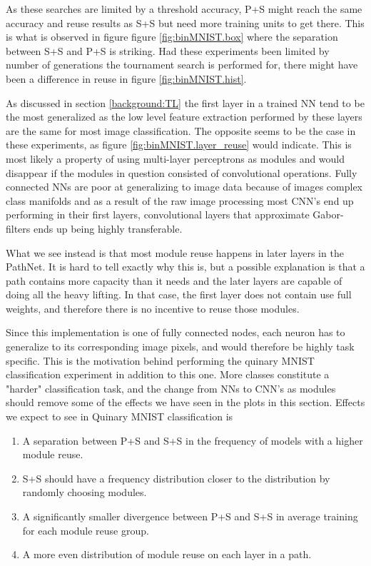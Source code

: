 As these searches are limited by a threshold accuracy, P+S might reach the same accuracy and reuse results as S+S but need more training units to get there. This is what is observed in figure figure \ref{fig:binMNIST.box} where the separation between S+S and P+S is striking. Had these experiments been limited by number of generations the tournament search is performed for, there might have been a difference in reuse in figure \ref{fig:binMNIST.hist}.

As discussed in section \ref{background:TL} the first layer in a trained NN tend to be the most generalized as the low level feature extraction performed by these layers are the same for most image classification. The opposite seems to be the case in these experiments, as figure \ref{fig:binMNIST.layer_reuse} would indicate. This is most likely a property of using multi-layer perceptrons as modules and would disappear if the modules in question consisted of convolutional operations. Fully connected NNs are poor at generalizing to image data because of images complex class manifolds and as a result of the raw image processing most CNN's end up performing in their first layers, convolutional layers that approximate Gabor-filters ends up being highly transferable\cite{yosinski2014transferable}.

What we see instead is that most module reuse happens in later layers in the PathNet. It is hard to tell exactly why this is, but a possible explanation is that a path contains more capacity than it needs and the later layers are capable of doing all the heavy lifting. In that case, the first layer does not contain use full weights, and therefore there is no incentive to reuse those modules. 

Since this implementation is one of fully connected nodes, each neuron has to generalize to its corresponding image pixels, and would therefore be highly task specific. This is the motivation behind performing the quinary MNIST classification experiment in addition to this one. More classes constitute a "harder" classification task, and the change from NNs to CNN's as modules should remove some of the effects we have seen in the plots in this section. Effects we expect to see in Quinary MNIST classification is

\begin{enumerate}
    \item A separation between P+S and S+S in the frequency of models with a higher module reuse.
    \item S+S should have a frequency distribution closer to the distribution by randomly choosing modules.
    \item A significantly smaller divergence between P+S and S+S in average training for each module reuse group. 
    \item A more even distribution of module reuse on each layer in a path.
\end{enumerate}


